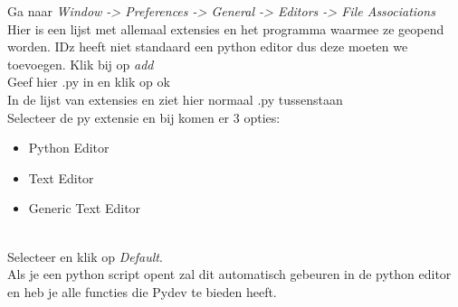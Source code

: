 Ga naar \textit{Window -> Preferences -> General -> Editors -> File Associations} \\

Hier is een lijst met allemaal extensies en het programma waarmee ze geopend worden. IDz heeft niet standaard een python editor dus deze moeten we toevoegen. Klik bij  op \textit{add} \\

Geef hier .py in en klik op ok \\

In de lijst van extensies en ziet hier normaal .py tussenstaan \\

Selecteer de py extensie en bij  komen er 3 opties:
\begin{itemize}
    \item Python Editor
    \item Text Editor
    \item Generic Text Editor
\end{itemize}
\\
Selecteer  en klik op \textit{Default}. \\


Als je een python script opent zal dit automatisch gebeuren in de python editor en heb je alle functies die Pydev te bieden heeft.


